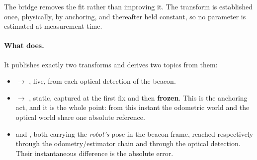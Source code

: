 The bridge removes the fit rather than improving it. The transform is
established once, physically, by anchoring, and thereafter held constant, so
no parameter is estimated at measurement time.

\paragraph{What  does.}
It publishes exactly two transforms and derives two topics from them:
\begin{itemize}[leftmargin=1.4em]
\item {} $\to$ , live, from each optical
  detection of the beacon.
\item {} $\to$ , static, captured at the first fix
  and then \textbf{frozen}. This is the anchoring act, and it is the whole
  point: from this instant the odometric world and the optical world share one
  absolute reference.
\item {} and , both carrying
  the \emph{robot's} pose in the beacon frame, reached respectively through
  the odometry/estimator chain and through the optical detection. Their
  instantaneous difference is the absolute error.
\end{itemize}

\begin{center}
\end{center}

